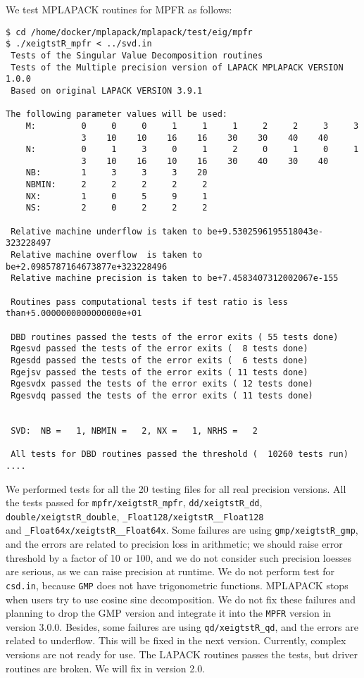 \documentclass[12pt]{article}
\begin{document}
We test MPLAPACK routines for MPFR as follows:
\begin{verbatim}
$ cd /home/docker/mplapack/mplapack/test/eig/mpfr
$ ./xeigtstR_mpfr < ../svd.in
 Tests of the Singular Value Decomposition routines
 Tests of the Multiple precision version of LAPACK MPLAPACK VERSION 1.0.0
 Based on original LAPACK VERSION 3.9.1

The following parameter values will be used:
    M:         0     0     0     1     1     1     2     2     3     3
               3    10    10    16    16    30    30    40    40
    N:         0     1     3     0     1     2     0     1     0     1
               3    10    16    10    16    30    40    30    40
    NB:        1     3     3     3    20
    NBMIN:     2     2     2     2     2
    NX:        1     0     5     9     1
    NS:        2     0     2     2     2

 Relative machine underflow is taken to be+9.5302596195518043e-323228497
 Relative machine overflow  is taken to be+2.0985787164673877e+323228496
 Relative machine precision is taken to be+7.4583407312002067e-155

 Routines pass computational tests if test ratio is less than+5.0000000000000000e+01

 DBD routines passed the tests of the error exits ( 55 tests done)
 Rgesvd passed the tests of the error exits (  8 tests done)
 Rgesdd passed the tests of the error exits (  6 tests done)
 Rgejsv passed the tests of the error exits ( 11 tests done)
 Rgesvdx passed the tests of the error exits ( 12 tests done)
 Rgesvdq passed the tests of the error exits ( 11 tests done)


 SVD:  NB =   1, NBMIN =   2, NX =   1, NRHS =   2

 All tests for DBD routines passed the threshold (  10260 tests run)
....
\end{verbatim}
We performed tests for all the 20 testing files for all real precision versions. 
All the tests passed for {\tt mpfr/xeigtstR\_mpfr}, {\tt dd/xeigtstR\_dd}, {\tt double/xeigtstR\_double},  
 {\tt \_Float128/xeigtstR\_\_Float128} \\
 and {\tt \_Float64x/xeigtstR\_\_Float64x}.
Some failures are using {\tt gmp/xeigtstR\_gmp}, and the errors are related to precision loss in arithmetic; we should raise error threshold by a factor of 10 or 100, and we do not consider such precision loesses are serious,
as we can raise precision at runtime.
We do not perform test for {\tt csd.in}, because {\tt GMP} does not have trigonometric functions. MPLAPACK stops
when users try to use cosine sine decomposition.
We do not fix these failures and planning to drop the GMP version and integrate it into the {\tt MPFR} version in version 3.0.0.  
Besides, some failures are using {\tt qd/xeigtstR\_qd}, and the errors are related to underflow. This will be fixed
in the next version. Currently, complex versions are not ready for use. The LAPACK routines passes the tests, but driver routines are broken. We will fix in version 2.0.
\end{document}
